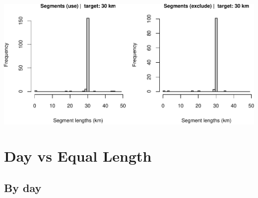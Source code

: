 \documentclass[
]{book}
\begin{document}
\includegraphics{figures/unnamed-chunk-76-1.pdf}

\hypertarget{day-vs-equal-length}{%
\section*{Day vs Equal Length}\label{day-vs-equal-length}}

\hypertarget{by-day}{%
\subsection*{By day}\label{by-day}}
\end{document}
